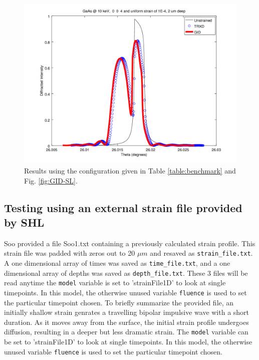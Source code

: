 \documentclass[letterpaper,11pt]{article}
\begin{document}
\begin{figure}
\begin{centering}
\includegraphics[scale = 0.65]{Linear_benchmark.png}
\caption{Results using the configuration given in Table \ref{table:benchmark} and Fig. \ref{fig:GID-SL}.}
\end{centering}
\end{figure}

\subsection{Testing using an external strain file provided by SHL}
Soo provided a file Soo1.txt containing a previously calculated strain profile.  This strain file was padded with zeros out to 20 $\mu m$ and resaved as \texttt{strain\_file.txt}.  A one dimensional array of times was saved as \texttt{time\_file.txt}, and a one dimensional array of depths was saved as \texttt{depth\_file.txt}. These 3 files will be read anytime the \texttt{model} variable is set to 'strainFile1D' to look at single timepoints.  In this model, the otherwise unused variable \texttt{fluence} is used to set the particular timepoint chosen.  To briefly summarize the provided file, an initially shallow strain genrates a travelling bipolar impulsive wave with a short duration.  As it moves away from the surface, the initial strain profile undergoes diffusion, resulting in a deeper but less dramatic strain.  The \texttt{model} variable can be set to 'strainFile1D' to look at single timepoints.  In this model, the otherwise unused variable \texttt{fluence} is used to set the particular timepoint chosen. 
\end{document}
